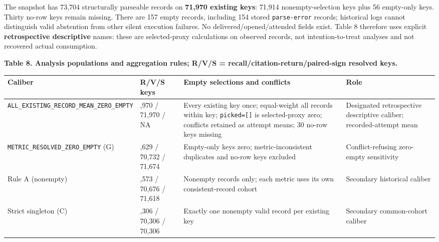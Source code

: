 \documentclass[
  11pt]{article}
\newcommand{\Needspace}[1]{%
  \par
  \ifdim\pagegoal>\pagetotal
    \ifdim\dimexpr\pagegoal-\pagetotal\relax<#1\relax
      \newpage
    \fi
  \fi
}
\begin{document}
The snapshot has 73,704 structurally parseable records on \textbf{71,970
existing keys}: 71,914 nonempty-selection keys plus 56 empty-only keys.
Thirty no-row keys remain missing. There are 157 empty records,
including 154 stored \texttt{parse-error} records; historical logs
cannot distinguish valid abstention from other silent execution
failures. No delivered/opened/attended fields exist. Table 8 therefore
uses explicit \textbf{retrospective descriptive} names: these are
selected-proxy calculations on observed records, not intention-to-treat
analyses and not recovered actual consumption.

\Needspace{16em}

\textbf{Table 8. Analysis populations and aggregation rules; R/V/S =
recall/citation-return/paired-sign resolved keys.}

\begin{longtable}[]{@{}
  >{\raggedright\arraybackslash}p{}
  >{\raggedright\arraybackslash}p{}
  >{\raggedright\arraybackslash}p{}
  >{\raggedright\arraybackslash}p{}@{}}
\toprule\noalign{}
\begin{minipage}[b]{\linewidth}\raggedright
Caliber
\end{minipage} & \begin{minipage}[b]{\linewidth}\raggedright
R/V/S keys
\end{minipage} & \begin{minipage}[b]{\linewidth}\raggedright
Empty selections and conflicts
\end{minipage} & \begin{minipage}[b]{\linewidth}\raggedright
Role
\end{minipage} \\
\midrule\noalign{}
\endhead
\bottomrule\noalign{}
\endlastfoot
\texttt{ALL\_EXISTING\_}\allowbreak \texttt{RECORD\_MEAN\_}\allowbreak \texttt{ZERO\_EMPTY}
& 71,970 / 71,970 / NA & Every existing key once; equal-weight all
records within key; \texttt{picked={[}{]}} is selected-proxy zero;
conflicts retained as attempt means; 30 no-row keys missing & Designated
retrospective descriptive caliber; recorded-attempt mean \\
\texttt{METRIC\_RESOLVED\_}\allowbreak \texttt{ZERO\_EMPTY} (G) & 71,629
/ 70,732 / 71,674 & Empty-only keys zero; metric-inconsistent duplicates
and no-row keys excluded & Conflict-refusing zero-empty sensitivity \\
Rule A (nonempty) & 71,573 / 70,676 / 71,618 & Nonempty records only;
each metric uses its own consistent-record cohort & Secondary historical
caliber \\
Strict singleton (C) & 70,306 / 70,306 / 70,306 & Exactly one nonempty
valid record per existing key & Secondary common-cohort caliber \\
\end{longtable}
\end{document}
